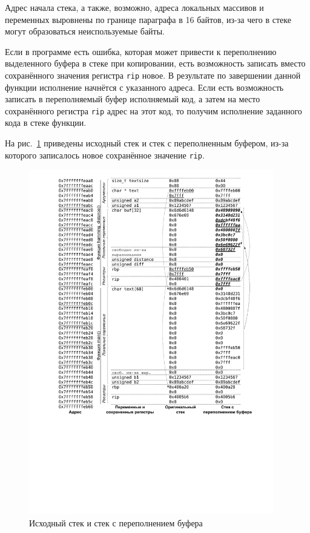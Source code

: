 Адрес начала стека, а также, возможно, адреса локальных массивов и переменных выровнены по границе параграфа в 16 байтов, из-за чего в стеке могут образоваться неиспользуемые байты.

Если в программе есть ошибка, которая может привести к переполнению выделенного буфера в стеке при копировании, есть возможность записать вместо сохранённого значения регистра \texttt{rip} новое. В результате по завершении данной функции исполнение начнётся с указанного адреса. Если есть возможность записать в переполняемый буфер исполняемый код, а затем на место сохранённого регистра \texttt{rip} адрес на этот код, то получим исполнение заданного кода в стеке функции.

На рис.~\ref{fig:stack-overflow} приведены исходный стек и стек с переполненным буфером, из-за которого записалось новое сохранённое значение \texttt{rip}.

\begin{figure}[!ht]
	\centering
	\includegraphics[width=0.95\textwidth]{pic/stack-overflow}
	\caption{Исходный стек и стек с переполнением буфера\label{fig:stack-overflow}}
\end{figure}


